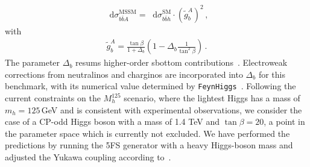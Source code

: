 \documentclass[11pt,a4paper]{article}
\newcommand{\dd}{\mathop{}\!\mathrm{d}}
\begin{document}
\begin{align}
	\dd \sigma_{b\bar b A}^{\text{MSSM}} = \dd \sigma_{b\bar b h}^{\text{SM}} \cdot (\tilde g_b^{A})^2\,,	\label{eq:BSMYuk}
\end{align}
with
\begin{align}
	\tilde{g}_b^A = \frac{\tan \beta}{1 + \Delta_b} \left( 1 - \Delta_b \frac{1}{\tan^2\beta} \right)\,.
\end{align}
The parameter \( \Delta_b \) resums higher-order sbottom contributions~\cite{Banks:1987iu,Hall:1993gn,Carena:1994bv,Carena:2000uj}. Electroweak corrections from neutralinos and charginos are incorporated into \( \Delta_b \) for this benchmark, with its numerical value determined by \texttt{FeynHiggs}~\cite{Heinemeyer:1998yj,Bahl:2018qog}. 
Following the current constraints on the $M_h^{125}$ scenario, where the lightest Higgs has a mass of $m_h= 125$\,GeV and is consistent with experimental observations, we consider the case of a CP-odd Higgs boson with a mass of 1.4 TeV and $\tan\beta = 20$, a point in the parameter space which is currently not excluded. 
We have performed the predictions by running the \minnlo{} 5FS generator with a heavy Higgs-boson mass and adjusted the Yukawa coupling according to~.
\end{document}

